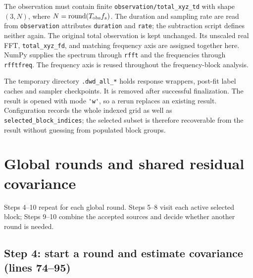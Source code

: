 \documentclass[11pt,a4paper]{article}
\newcommand{\code}[1]{\texttt{\nolinkurl{#1}}}
\begin{document}
The observation must contain finite \code{observation/total_xyz_td} with shape
\((3,N)\), where \(N=\mathrm{round}(T_{\rm obs}f_s)\). The duration and sampling rate are read from \code{observation} attributes
\code{duration} and \code{rate}; the subtraction script defines neither again.
The original total observation is kept unchanged. Its unscaled real FFT,
\code{total_xyz_fd}, and matching frequency axis are assigned together here.
NumPy supplies the spectrum through \code{rfft} and the frequencies through
\code{rfftfreq}. The frequency axis is reused throughout the frequency-block
analysis.

The temporary directory \code{.dwd_all_*} holds response wrappers, post-fit
label caches and sampler checkpoints. It is removed after successful
finalization. The result is opened with mode \code{'w'}, so a rerun replaces an
existing result. Configuration records the whole indexed grid as well as
\code{selected_block_indices}; the selected subset is therefore recoverable from
the result without guessing from populated block groups.

\section{Global rounds and shared residual covariance}
\label{sec:architecture}

Steps 4--10 repeat for each global round. Steps 5--8 visit each active selected
block; Steps 9--10 combine the accepted sources and decide whether another
round is needed.

\subsection{Step 4: start a round and estimate covariance (lines 74--95)}
\end{document}
